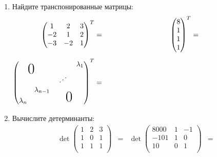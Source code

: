 {\begin{enumerate}
        \item Найдите транспонированные матрицы:
        \begin{alignat*}{2}
            \begin{pmatrix}
                1 & 2 & 3\\
               -2 & 1 & 2\\
               -3 & -2 & 1\\
            \end{pmatrix}
            ^T&=
            & \hspace{3cm}
            \begin{pmatrix}
                8 \\
                1 \\
                1 \\
                1 \\
            \end{pmatrix}
            ^T &=\hspace{3cm} \\[0.5em]
            \begin{pmatrix}
                   \     &               &                       & \lambda_1  \\
                   \     & \shiftright{-30pt}{\raisebox{20pt}{\bigzero}}      & \reflectbox{$\ddots$} &  \\
                   \     & \lambda_{n-1} & \raisebox{-7pt}{\shiftright{17pt}{\bigzero}}              &  \\
               \lambda_n &               &                       & 
            \end{pmatrix}
            ^T&= 
        \end{alignat*}


        \item Вычислите детерминанты:
        \begin{align*}
            \det 
            \begin{pmatrix}
                1 & 2 & 3 \\
                1 & 0 & 1\\
                1 & 1 & 1\\
            \end{pmatrix}
            &= 
            &
            \det 
            \begin{pmatrix}
                8000 & 1 & -1 \\
                -101 & 1 & 0 \\
                10 & 0 & 1 \\
            \end{pmatrix}
            &=
        \end{align*}



\end{enumerate}}
